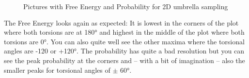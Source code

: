 \documentclass[a4paper,11pt]{scrartcl}
\begin{document}
\begin{figure} [htb]
	\caption{Pictures with Free Energy and Probability for 2D umbrella sampling}
	\label{fig:umbrella_2d}
\end{figure}

The Free Energy looks again as expected: It is lowest in the corners of the plot where both torsions are at 180° and highest in the middle of the plot where both torsions are 0°. You can also quite well see the other maxima where the torsional angles are -120 or +120°. The probability has quite a bad resolution but you can see the peak probability at the corners and -- with a bit of imagination -- also the smaller peaks for torsional angles of $\pm$ 60°.
\end{document}
